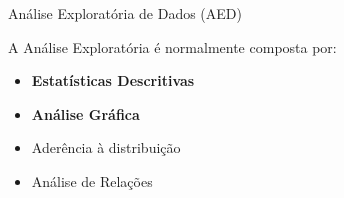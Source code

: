 \documentclass{beamer}\usepackage[]{graphicx}\usepackage[]{color}
\begin{document}
\begin{frame}{Análise Exploratória de Dados (AED)}
\linespread{1.5} 
 
 A Análise Exploratória é normalmente composta por:
 
\begin{itemize}

\item \textbf{Estatísticas Descritivas}
\item	\textbf{Análise Gráfica}
\item  Aderência à distribuição
\item Análise de Relações

\end{itemize}


\end{frame} 
\end{document}
